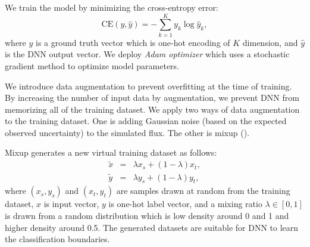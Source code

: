 \documentclass[useamsfonts]{pasj01}
\begin{document}
We train the model by minimizing the cross-entropy error: 
\begin{equation}
\mathrm{CE} \left(y, \hat{y} \right) =　-\sum_{k = 1}^K y_k \log \hat{y}_k,
\end{equation}
where $y$ is a ground truth vector which is one-hot encoding of $K$ dimension, and $\hat{y}$ is the DNN output vector.
We deploy {\it Adam optimizer} which uses a stochastic gradient method to optimize model parameters.

We introduce data augmentation to prevent overfitting at the time of training.
By increasing the number of input data by augmentation, we prevent DNN from memorizing all of the training dataset.
We apply two ways of data augmentation to the training dataset.
One is adding Gaussian noise (based on the expected observed uncertainty) to the simulated flux.
The other is mixup (\cite{mixup}).

Mixup generates a new virtual training dataset as follows:
\begin{eqnarray*}
    \tilde{x} &=& \lambda x_s + \left( 1-\lambda \right) x_t, \\
    \tilde{y} &=& \lambda y_s + \left( 1-\lambda \right) y_t,
\end{eqnarray*}
where $\left(x_s, y_s\right)$ and $\left(x_t, y_t\right)$ are samples drawn at random from the training dataset, $x$ is input vector, $y$ is one-hot label vector, 
and a mixing ratio $\lambda \in \left[0, 1\right]$ is drawn from a random distribution which is low density around 0 and 1 and higher density around 0.5. 
The generated datasets are suitable for DNN to learn the classification boundaries.
\end{document}
